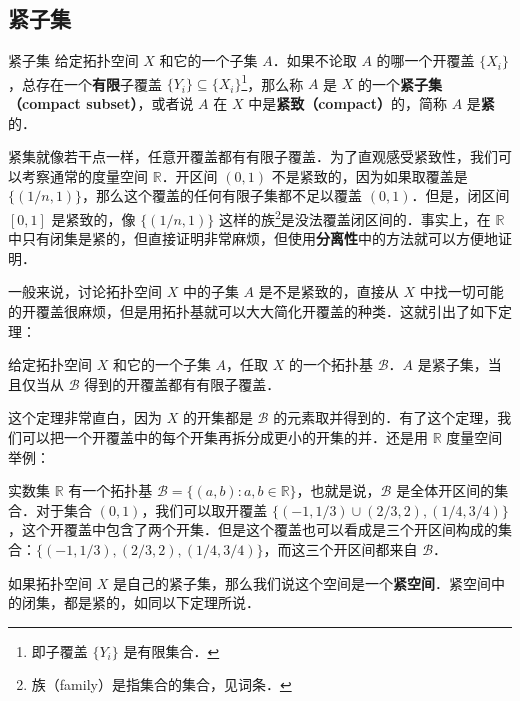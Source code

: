 \subsection{紧子集}

\begin{definition}{紧子集}\label{Topo2_def1}
给定拓扑空间 $X$ 和它的一个子集 $A$．如果不论取 $A$ 的哪一个开覆盖 $\{X_i\}$，总存在一个\textbf{有限}子覆盖 $\{Y_i\}\subseteq \{X_i\}$\footnote{即子覆盖 $\{Y_i\}$ 是有限集合．}，那么称 $A$ 是 $X$ 的一个\textbf{紧子集（compact subset）}，或者说 $A$ 在 $X$ 中是\textbf{紧致（compact）}的，简称 $A$ 是\textbf{紧}的．
\end{definition}

紧集就像若干点一样，任意开覆盖都有有限子覆盖．为了直观感受紧致性，我们可以考察通常的度量空间 $\mathbb{R}$．开区间 $(0,1)$ 不是紧致的，因为如果取覆盖是 $\{(1/n, 1)\}$，那么这个覆盖的任何有限子集都不足以覆盖 $(0, 1)$．但是，闭区间 $[0,1]$ 是紧致的，像 $\{(1/n, 1)\}$ 这样的族\footnote{族（family）是指集合的集合，见词条．}是没法覆盖闭区间的．事实上，在 $\mathbb{R}$ 中只有闭集是紧的，但直接证明非常麻烦，但使用\textbf{分离性}中的方法就可以方便地证明．

一般来说，讨论拓扑空间 $X$ 中的子集 $A$ 是不是紧致的，直接从 $X$ 中找一切可能的开覆盖很麻烦，但是用拓扑基就可以大大简化开覆盖的种类．这就引出了如下定理：

\begin{theorem}{}\label{Topo2_the1}
给定拓扑空间 $X$ 和它的一个子集 $A$，任取 $X$ 的一个拓扑基 $\mathcal{B}$．$A$ 是紧子集，当且仅当从 $\mathcal{B}$ 得到的开覆盖都有有限子覆盖．
\end{theorem}

这个定理非常直白，因为 $X$ 的开集都是 $\mathcal{B}$ 的元素取并得到的．有了这个定理，我们可以把一个开覆盖中的每个开集再拆分成更小的开集的并．还是用 $\mathbb{R}$ 度量空间举例：

\begin{example}{}\label{Topo2_ex1}
实数集 $\mathbb{R}$ 有一个拓扑基 $\mathcal{B}=\{(a,b):a,b\in \mathbb{R}\}$，也就是说，$\mathcal{B}$ 是全体开区间的集合．对于集合 $(0,1)$，我们可以取开覆盖 $\{(-1,1/3)\cup(2/3,2), (1/4, 3/4)\}$，这个开覆盖中包含了两个开集．但是这个覆盖也可以看成是三个开区间构成的集合：$\{(-1,1/3), (2/3,2), (1/4, 3/4)\}$，而这三个开区间都来自 $\mathcal{B}$．

\end{example}

如果拓扑空间 $X$ 是自己的紧子集，那么我们说这个空间是一个\textbf{紧空间}．紧空间中的闭集，都是紧的，如同以下定理所说．

